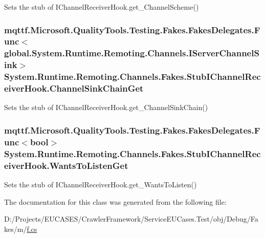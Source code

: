 Sets the stub of I\-Channel\-Receiver\-Hook.\-get\-\_\-\-Channel\-Scheme()

\hypertarget{class_system_1_1_runtime_1_1_remoting_1_1_channels_1_1_fakes_1_1_stub_i_channel_receiver_hook_a66a8dce38a4c3035b796e6655844c273}{
\subsubsection[{Channel\-Sink\-Chain\-Get}]{\setlength{\rightskip}{0pt plus 5cm}mqttf.\-Microsoft.\-Quality\-Tools.\-Testing.\-Fakes.\-Fakes\-Delegates.\-Func$<$global.\-System.\-Runtime.\-Remoting.\-Channels.\-I\-Server\-Channel\-Sink$>$ System.\-Runtime.\-Remoting.\-Channels.\-Fakes.\-Stub\-I\-Channel\-Receiver\-Hook.\-Channel\-Sink\-Chain\-Get}}\label{class_system_1_1_runtime_1_1_remoting_1_1_channels_1_1_fakes_1_1_stub_i_channel_receiver_hook_a66a8dce38a4c3035b796e6655844c273}


Sets the stub of I\-Channel\-Receiver\-Hook.\-get\-\_\-\-Channel\-Sink\-Chain()

\hypertarget{class_system_1_1_runtime_1_1_remoting_1_1_channels_1_1_fakes_1_1_stub_i_channel_receiver_hook_a76e2054f610ae9099bb86cefab806d7b}{
\subsubsection[{Wants\-To\-Listen\-Get}]{\setlength{\rightskip}{0pt plus 5cm}mqttf.\-Microsoft.\-Quality\-Tools.\-Testing.\-Fakes.\-Fakes\-Delegates.\-Func$<$bool$>$ System.\-Runtime.\-Remoting.\-Channels.\-Fakes.\-Stub\-I\-Channel\-Receiver\-Hook.\-Wants\-To\-Listen\-Get}}\label{class_system_1_1_runtime_1_1_remoting_1_1_channels_1_1_fakes_1_1_stub_i_channel_receiver_hook_a76e2054f610ae9099bb86cefab806d7b}


Sets the stub of I\-Channel\-Receiver\-Hook.\-get\-\_\-\-Wants\-To\-Listen()



The documentation for this class was generated from the following file\-:\begin{DoxyCompactItemize}
\item 
D\-:/\-Projects/\-E\-U\-C\-A\-S\-E\-S/\-Crawler\-Framework/\-Service\-E\-U\-Cases.\-Test/obj/\-Debug/\-Fakes/m/\hyperlink{m_2f_8cs}{f.\-cs}\end{DoxyCompactItemize}
